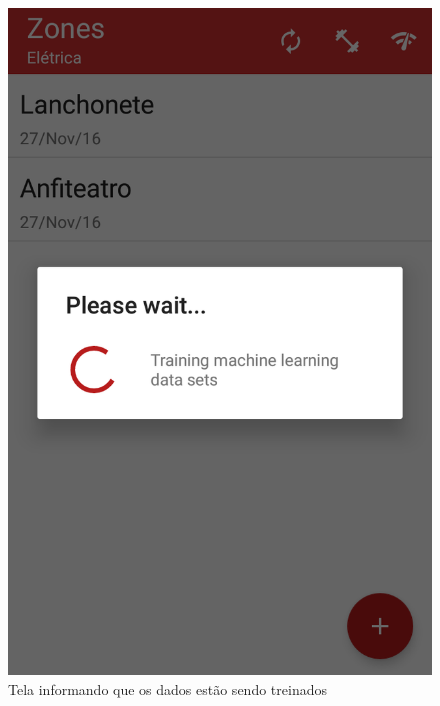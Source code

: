 \begin{figure}[H]
  \centering
  \begin{minipage}[b]{0.4\textwidth}
    \includegraphics[width=\textwidth]{imagens/screenshots/training.png}
    \caption{Tela informando que os dados estão sendo treinados}
  \end{minipage}
  \hfill
  \begin{minipage}[b]{0.4\textwidth}

\end{minipage}
\end{figure}
